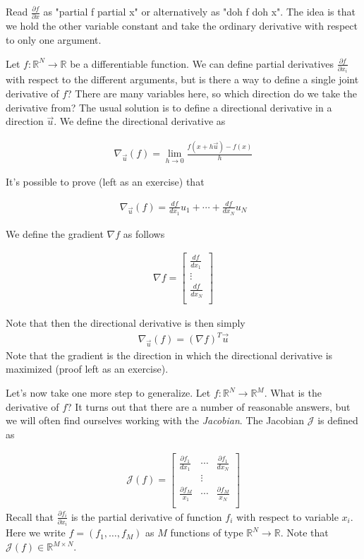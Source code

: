 \documentclass[book.tex]{subfiles}
\begin{document}
Read $\frac{\partial f}{\partial x}$ as "partial f partial x" or alternatively as "doh f doh x". The idea is that we hold the other variable constant and take the ordinary derivative with respect to only one argument.

Let $f: \mathbb{R}^N \to \mathbb{R}$ be a differentiable function. We can define partial derivatives $\frac{\partial f}{\partial x_i}$ with respect to the different arguments, but is there a way to define a single joint derivative of $f$? There are many variables here, so which direction do we take the derivative from? The usual solution is to define a directional derivative in a direction $\vec{u}$. We define the directional derivative as

\begin{align}
    \nabla_{\vec{u}}(f) = \lim_{h \to 0} \frac{f(x + h\vec{u}) - f(x)}{h}
\end{align}

It's possible to prove (left as an exercise) that

\begin{align}\nabla_{\vec{u}}(f) = \frac{df}{dx_1}u_1 + \cdots + \frac{df}{dx_N} u_N \end{align}

We define the gradient $\nabla f$ as follows

\begin{align} \nabla f = \begin{bmatrix}
    \frac{df}{dx_1} \\
    \vdots \\
    \frac{df}{dx_N} \\
    \end{bmatrix} \end{align}
    
Note that then the directional derivative is then simply 
\begin{align}\nabla_{\vec{u}}(f) = (\nabla f)^T \vec{u}\end{align}
Note that the gradient is the direction in which the directional derivative is maximized (proof left as an exercise).

Let's now take one more step to generalize. Let $f: \mathbb{R}^N \to \mathbb{R}^M$. What is the derivative of $f$?  It turns out that there are a number of reasonable answers, but we will often find ourselves working with the \textit{Jacobian}. The Jacobian $\mathcal{J}$ is defined as 

\begin{align} \mathcal{J}(f) = \begin{bmatrix}
    \frac{\partial f_1}{dx_1} & \cdots & \frac{\partial f_1}{dx_N} \\
    & \vdots & \\
    \frac{\partial f_M}{x_1} & \cdots & \frac{\partial f_M}{x_N} \\
    \end{bmatrix}
\end{align}
Recall that $\frac{\partial f_i}{\partial x_i}$ is the partial derivative of function $f_i$ with respect to variable $x_i$.
Here we write $f = (f_1, \dotsc, f_M)$ as $M$ functions of type $\mathbb{R}^N \to \mathbb{R}$. Note that $\mathcal{J}(f) \in \mathbb{R}^{M \times N}$.
\end{document}
